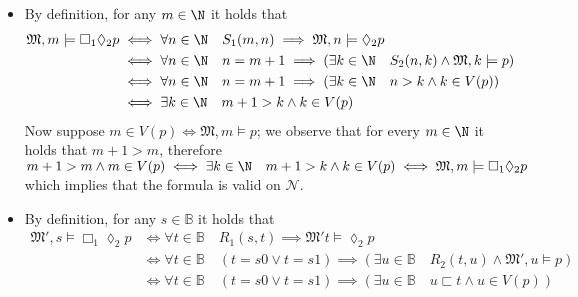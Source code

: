 \documentclass[a4paper, 12pt]{report}
\begin{document}
{\begin{enumerate}[label=(\alph*)]
\begin{itemize}
                    \item By definition, for any $m \in \N$ it holds that
                        \begin{equation*}
                            \begin{split}
                                \mathfrak M, m \models \Box_1 \lozenge_2 p &\iff \forall n \in \N \quad S_1(m, n) \implies \mathfrak M, n \models \lozenge_2 p \\
                                                                         &\iff \forall n \in \N \quad n = m + 1 \implies (\exists k \in \N \quad S_2(n, k) \land \mathfrak M, k \models p) \\
                                                                         &\iff \forall n \in \N \quad n = m + 1 \implies (\exists k \in \N \quad n > k \land k \in V(p)) \\
                                                                         &\iff \exists k \in \N \quad m + 1 > k \land k \in V(p)
                            \end{split}
                        \end{equation*}
                        Now suppose $m \in V(p) \iff \mathfrak M, m \models p$; we observe that for every $m \in \N$ it holds that $m + 1 > m$, therefore $m + 1 > m \land m \in V(p) \iff \exists k \in \N \quad m + 1 > k \land k \in V(p) \iff \mathfrak M, m \models \Box_1 \lozenge_2 p$ which implies that the formula is valid on $\mathcal N$.
                    \item By definition, for any $s \in \mathbb B$ it holds that
                        \begin{equation*}
                            \begin{split}
                                \mathfrak M', s \models \Box_1 \lozenge_2 p &\iff \forall t \in \mathbb B \quad R_1(s, t) \implies \mathfrak M' t \models \lozenge_2 p \\
                                                                            &\iff \forall t \in \mathbb B \quad (t = s0 \lor t = s1) \implies (\exists u \in \mathbb B \quad R_2(t, u) \land \mathfrak M', u \models p) \\
                                                                            &\iff \forall t \in \mathbb B \quad (t = s0 \lor t = s1) \implies (\exists u \in \mathbb B \quad u \sqsubset t \land u \in V(p))
                            \end{split}
                        \end{equation*}

\end{itemize}
\end{enumerate}}
\end{document}
